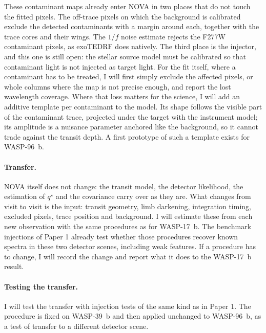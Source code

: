 These contaminant maps already enter NOVA in two places that do not touch
the fitted pixels. The off-trace pixels on which the background is
calibrated exclude the detected contaminants with a margin around each,
together with the trace cores and their wings. The $1/f$ noise estimate
rejects the F277W contaminant pixels, as exoTEDRF does natively. The
third place is the injector, and this one is still open: the stellar
source model must be calibrated so that contaminant light is not injected
as target light. For the fit itself, where a contaminant has to be
treated, I will first simply exclude the affected pixels, or whole columns
where the map is not precise enough, and report the lost wavelength
coverage. Where that loss matters for the science, I will add an additive
template per contaminant to the model. Its shape follows the visible part
of the contaminant trace, projected under the target with the instrument
model; its amplitude is a nuisance parameter anchored like the background,
so it cannot trade against the transit depth. A first prototype of such a
template exists for WASP-96~b.

\paragraph{Transfer.}
NOVA itself does not change: the transit model, the detector likelihood,
the estimation of $q^\star$ and the covariance carry over as they are.
What changes from visit to visit is the input: transit geometry, limb
darkening, integration timing, excluded pixels, trace position and
background. I will estimate these from each new observation with the same
procedures as for WASP-17~b. The benchmark injections of Paper 1 already
test whether those procedures recover known spectra in these two detector
scenes, including weak features. If a procedure has to change, I will
record the change and report what it does to the WASP-17~b result.

\paragraph{Testing the transfer.}
I will test the transfer with injection tests of the same kind as in
Paper 1. The procedure is fixed on WASP-39~b and then applied unchanged
to WASP-96~b, as a test of transfer to a different detector scene.

